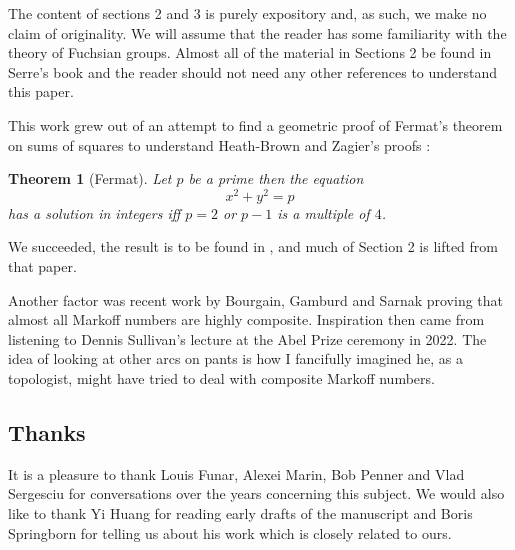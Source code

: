 \documentclass[12pt,a4paper]{amsart}
\newtheorem{thm}{Theorem}[section]
\begin{document}
The content of sections 2 and 3 is purely expository and, as such, we make no
claim of originality. We will assume that the reader has some familiarity with
the theory of Fuchsian groups. Almost all  of the material in Sections 2 be
found in Serre's book \cite{serre} and the reader should not need any other
references to understand this paper. 

This work grew out of an attempt to find a geometric proof of Fermat's theorem
on sums of squares to understand Heath-Brown and Zagier's proofs \cite{zagier}:

 \begin{thm}[Fermat]
 Let $p$ be a prime then the equation
 $$x^2 + y^2 = p $$
 has a solution in integers  iff  $p =2$ or $p-1$ is a multiple of $4$.
 \end{thm}

 \noindent We succeeded, the result is to be found in \cite{squares}, and much
 of Section 2 is lifted from that paper.

Another factor was recent work by Bourgain, Gamburd and Sarnak proving that
almost all Markoff numbers are highly composite. Inspiration then  came from
listening to Dennis Sullivan's lecture at the Abel Prize ceremony in 2022. The
idea of looking at other arcs on pants is how I fancifully imagined he, as a
topologist, might have tried to deal with composite Markoff numbers.


 

\subsection{Thanks}

It is a pleasure to thank Louis Funar, Alexei Marin, Bob Penner and Vlad
Sergesciu for  conversations over the years concerning this subject. We would
also like to thank Yi Huang for reading early drafts of the manuscript and
Boris Springborn  for telling us about his work
\cite{spring} which is closely related to ours.
\end{document}
